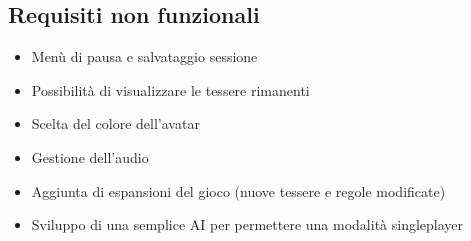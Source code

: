 \subsection{Requisiti non funzionali}
\begin{itemize}
\item Menù di pausa e salvataggio sessione
\end{itemize}
\begin{itemize}
\item Possibilità di visualizzare le tessere rimanenti
\end{itemize}
\begin{itemize}
\item Scelta del colore dell’avatar
\end{itemize}
\begin{itemize}
\item Gestione dell’audio
\end{itemize}
\begin{itemize}
\item Aggiunta di espansioni del gioco (nuove tessere e regole modificate)
\end{itemize}
\begin{itemize}
\item Sviluppo di una semplice AI per permettere una modalità singleplayer
\end{itemize}

